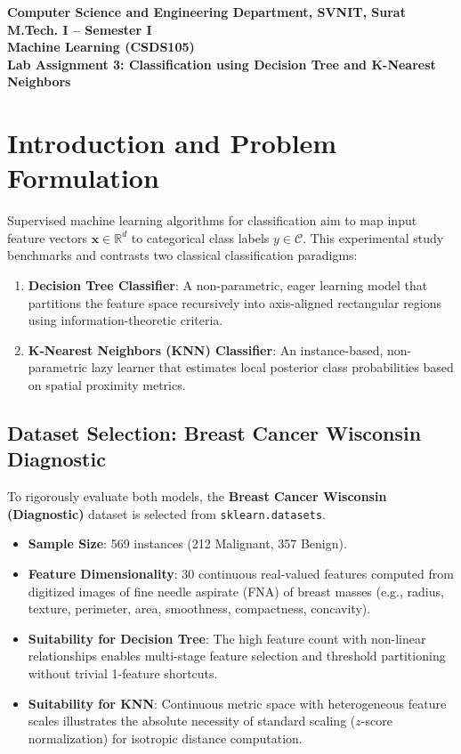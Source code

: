 \documentclass[12pt]{article}
\begin{document}

\begin{center}
\textbf{Computer Science and Engineering Department, SVNIT, Surat}\\
\textbf{M.Tech. I -- Semester I}\\
\textbf{Machine Learning (CSDS105)}\\
\textbf{Lab Assignment 3: Classification using Decision Tree and K-Nearest Neighbors}
\end{center}

\vspace{0.3cm}

\section{Introduction and Problem Formulation}

Supervised machine learning algorithms for classification aim to map input feature vectors $\mathbf{x} \in \mathbb{R}^d$ to categorical class labels $y \in \mathcal{C}$. This experimental study benchmarks and contrasts two classical classification paradigms:
\begin{enumerate}
    \item \textbf{Decision Tree Classifier}: A non-parametric, eager learning model that partitions the feature space recursively into axis-aligned rectangular regions using information-theoretic criteria.
    \item \textbf{K-Nearest Neighbors (KNN) Classifier}: An instance-based, non-parametric lazy learner that estimates local posterior class probabilities based on spatial proximity metrics.
\end{enumerate}

\subsection{Dataset Selection: Breast Cancer Wisconsin Diagnostic}
To rigorously evaluate both models, the \textbf{Breast Cancer Wisconsin (Diagnostic)} dataset is selected from \texttt{sklearn.datasets}. 
\begin{itemize}
    \item \textbf{Sample Size}: 569 instances (212 Malignant, 357 Benign).
    \item \textbf{Feature Dimensionality}: 30 continuous real-valued features computed from digitized images of fine needle aspirate (FNA) of breast masses (e.g., radius, texture, perimeter, area, smoothness, compactness, concavity).
    \item \textbf{Suitability for Decision Tree}: The high feature count with non-linear relationships enables multi-stage feature selection and threshold partitioning without trivial 1-feature shortcuts.
    \item \textbf{Suitability for KNN}: Continuous metric space with heterogeneous feature scales illustrates the absolute necessity of standard scaling ($z$-score normalization) for isotropic distance computation.
\end{itemize}
\end{document}
